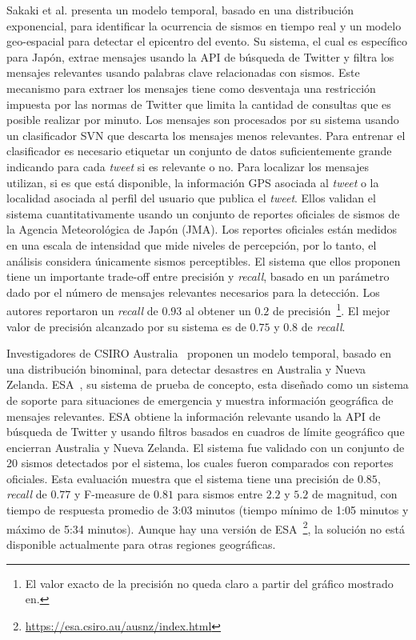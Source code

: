 Sakaki et al. \cite{sakaki2013tweet}  presenta un modelo temporal, basado en una distribución exponencial, para identificar la ocurrencia de sismos en tiempo real y un modelo geo-espacial para detectar el epicentro del evento.
%
Su sistema, el cual es específico para Japón, extrae mensajes usando la API de búsqueda de Twitter y filtra los mensajes relevantes usando palabras clave relacionadas con sismos. 
%
Este mecanismo para extraer los mensajes tiene como desventaja una restricción impuesta por las normas de Twitter que limita la cantidad de consultas que es posible realizar por minuto.
%
Los mensajes son procesados por su sistema usando un clasificador SVN que descarta los mensajes menos relevantes. 
%
Para entrenar el clasificador es necesario etiquetar un conjunto de datos suficientemente grande indicando para cada {\em tweet} si es relevante o no.
%
Para localizar los mensajes utilizan, si es que está disponible, la información GPS asociada al {\em tweet} o la localidad asociada al perfil del usuario que publica el {\em tweet}. 
%
Ellos validan el sistema cuantitativamente usando un conjunto de reportes oficiales de sismos de la Agencia Meteorológica de Japón (JMA).
%
Los reportes oficiales están medidos en una escala de intensidad que mide niveles de percepción, por lo tanto, el análisis considera únicamente sismos perceptibles.
%
El sistema que ellos proponen tiene un importante trade-off entre precisión y {\em recall}, basado en un parámetro dado por el número de mensajes relevantes necesarios para la detección. 
%
Los autores reportaron un {\em recall} de $0.93$ al obtener un $0.2$ de precisión~\footnote{El valor exacto de la precisión no queda claro a partir del gráfico mostrado en\cite{sakaki2013tweet}.}.
%
El mejor valor de precisión alcanzado por su sistema es de $0.75$ y $0.8$ de {\em recall}.


Investigadores de CSIRO Australia~\cite{yin2012using} proponen un modelo temporal, basado en una distribución binominal, para detectar desastres en Australia y Nueva Zelanda. 
%
ESA~\cite{robinson2013sensitive}, su sistema de prueba de concepto, esta diseñado como un sistema de soporte para situaciones de emergencia y muestra información geográfica de mensajes relevantes. 
%
ESA obtiene la información relevante usando la API de búsqueda de Twitter y usando filtros basados en cuadros de límite geográfico que encierran Australia y Nueva Zelanda.
%
El sistema fue validado con un conjunto de 20 sismos detectados por el sistema, los cuales fueron comparados con reportes oficiales.
%
Esta evaluación muestra que el sistema tiene una precisión de $0.85$, {\em recall} de $0.77$ y F-measure de $0.81$ para sismos entre $2.2$ y $5.2$ de magnitud, con tiempo de respuesta promedio de 3:03 minutos (tiempo mínimo de 1:05 minutos y máximo de 5:34 minutos).
%
Aunque hay una versión de ESA~\footnote{\url{https://esa.csiro.au/ausnz/index.html}}, la solución no está disponible actualmente para otras regiones geográficas. 



